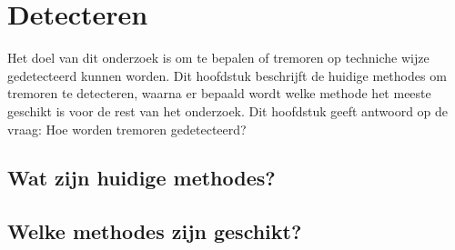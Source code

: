 \section{Detecteren}
\label{section:detection}

Het doel van dit onderzoek is om te bepalen of tremoren op techniche wijze gedetecteerd kunnen worden.
Dit hoofdstuk beschrijft de huidige methodes om tremoren te detecteren,
waarna er bepaald wordt welke methode het meeste geschikt is voor de rest van het onderzoek.
Dit hoofdstuk geeft antwoord op de vraag: Hoe worden tremoren gedetecteerd?

\subsection{Wat zijn huidige methodes?}

\subsection{Welke methodes zijn geschikt?}